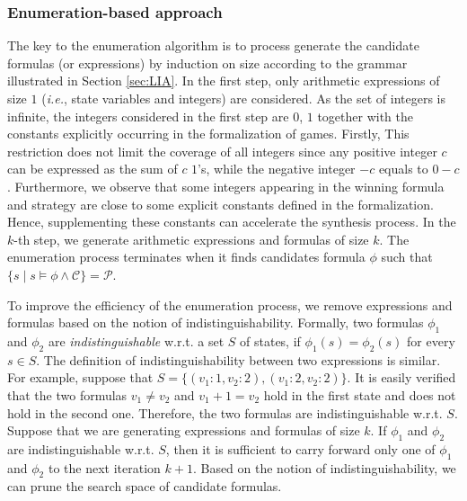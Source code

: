 \documentclass[review]{elsarticle}
\newcommand{\set}[1]{\{ #1 \}}
\newcommand{\positiveSet}{\mathcal{P}}
\newcommand{\constraint}{\mathcal{C}}
\newcommand\ie{{\it i.e.}}
\begin{document}
	\subsubsection{Enumeration-based approach}
	The key to the enumeration algorithm is to process generate the candidate formulas (or expressions) by induction on size according to the grammar illustrated in Section \ref{sec:LIA}.
	In the first step, only arithmetic expressions of size $1$ (\ie, state variables and integers) are considered.
	As the set of integers is infinite, the integers considered in the first step are $0$, $1$ together with the constants explicitly occurring in the formalization of games.
	Firstly, This restriction does not limit the coverage of all integers since any positive integer $c$ can be expressed as the sum of $c$ $1$'s, while the negative integer $-c$ equals to $0 - c$.
	Furthermore, we observe that some integers appearing in the winning formula and strategy are close to some explicit constants defined in the formalization.
	Hence, supplementing these constants can accelerate the synthesis process.
	In the $k$-th step, we generate arithmetic expressions and formulas of size $k$.
	The enumeration process terminates when it finds candidates formula $\phi$ such that $\set{s \mid s \models \phi \land \constraint} = \positiveSet$.

	To improve the efficiency of the enumeration process, we remove expressions and formulas based on the notion of indistinguishability.
	Formally, two formulas $\phi_1$ and $\phi_2$ are \textit{indistinguishable} w.r.t. a set $S$ of states, if $\phi_1(s) = \phi_2(s)$ for every $s \in S$.
	The definition of indistinguishability between two expressions is similar.
	For example, suppose that $S = \set{(v_1 : 1, v_2 : 2), (v_1 : 2, v_2 : 2)}$.
	It is easily verified that the two formulas $v_1 \neq v_2$ and $v_1 + 1 = v_2$ hold in the first state and does not hold in the second one.
	Therefore, the two formulas are indistinguishable w.r.t. $S$.
	Suppose that we are generating expressions and formulas of size $k$.
	If $\phi_1$ and $\phi_2$ are indistinguishable w.r.t. $S$, then it is sufficient to carry forward only one of $\phi_1$ and $\phi_2$ to the next iteration $k + 1$.
	Based on the notion of indistinguishability, we can prune the search space of candidate formulas.
\end{document}
